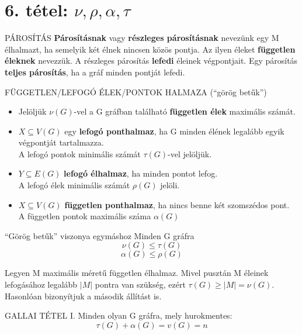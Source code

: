 \section{6. tétel: $\nu, \rho, \alpha, \tau$}

\begin{definicio}{PÁROSÍTÁS}
\textbf{Párosításnak} vagy \textbf{részleges párosításnak} nevezünk egy M élhalmazt, ha semelyik két élnek nincsen közös pontja. Az ilyen éleket \textbf{független éleknek} nevezzük. A részleges párosítás \textbf{lefedi} éleinek végpontjait. Egy párosítás \textbf{teljes párosítás}, ha a gráf minden pontját lefedi.
\end{definicio}

\begin{definicio}{FÜGGETLEN/LEFOGÓ ÉLEK/PONTOK HALMAZA (``görög betűk'')}
  \begin{itemize}
  \item Jelöljük $\nu(G)$-vel a G gráfban található \textbf{független élek} maximális számát.
  \item $X \subseteq V(G)$ egy \textbf{lefogó ponthalmaz}, ha G minden élének legalább egyik végpontját tartalmazza.\\
    A lefogó pontok minimális számát $\tau(G)$-vel jelöljük.
  \item $Y \subseteq E(G)$ \textbf{lefogó élhalmaz}, ha minden pontot lefog.\\
    A lefogó élek minimális számát $\rho(G)$ jelöli.
  \item $X \subseteq V(G)$ \textbf{független ponthalmaz}, ha nincs benne két szomszédos pont.\\
    A független pontok maximális száma $\alpha(G)$
  \end{itemize}

\end{definicio}

\begin{tetel}{``Görög betűk'' viszonya egymáshoz}
Minden G gráfra
$$\nu(G) \leq \tau(G)$$
$$\alpha(G) \leq \rho(G)$$
\end{tetel}

\begin{bizonyitas}{}
Legyen M maximális méretű független élhalmaz. Mivel pusztán M éleinek lefogásához legalább $|M|$ pontra van szükség, ezért $\tau(G) \geq |M| = \nu(G)$.
Hasonlóan bizonyítjuk a második állítást is.
\end{bizonyitas}

\begin{tetel}{GALLAI TÉTEL I.}
Minden olyan G gráfra, mely hurokmentes:
$$\tau(G) + \alpha(G) = v(G) = n$$
\end{tetel}

